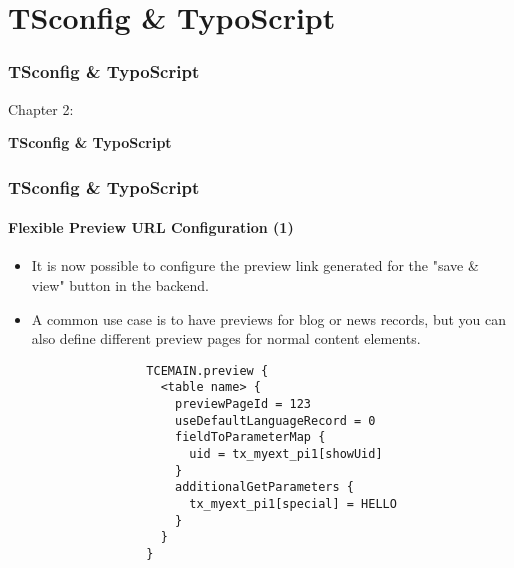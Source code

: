 %

\section{TSconfig \& TypoScript}
\begin{frame}[fragile]
	\frametitle{TSconfig \& TypoScript}

	\begin{center}\huge{Chapter 2:}\end{center}
	\begin{center}\huge{\color{typo3darkgrey}\textbf{TSconfig \& TypoScript}}\end{center}

\end{frame}

\begin{frame}[fragile]
	\frametitle{TSconfig \& TypoScript}
	\framesubtitle{Flexible Preview URL Configuration (1)}

	\lstset{basicstyle=\tiny\ttfamily}

	\begin{itemize}

		\item It is now possible to configure the preview link generated for the\newline
			"save \& view" button in the backend.

		\item A common use case is to have previews for blog or news records, but you
			can also define different preview pages for normal content elements.

			\begin{lstlisting}
				TCEMAIN.preview {
				  <table name> {
				    previewPageId = 123
				    useDefaultLanguageRecord = 0
				    fieldToParameterMap {
				      uid = tx_myext_pi1[showUid]
				    }
				    additionalGetParameters {
				      tx_myext_pi1[special] = HELLO
				    }
				  }
				}
			\end{lstlisting}

	\end{itemize}

\end{frame}

